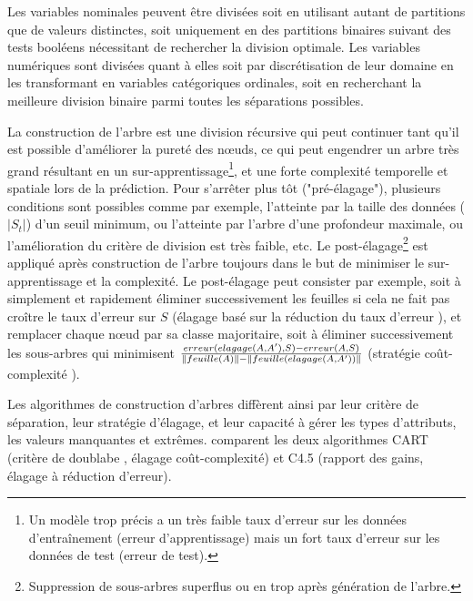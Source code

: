Les variables nominales peuvent être divisées soit en utilisant autant de partitions que de valeurs distinctes, soit uniquement en des partitions binaires suivant des tests booléens nécessitant de rechercher la division optimale. Les variables numériques sont divisées quant à elles soit par discrétisation de leur domaine en les transformant en variables catégoriques ordinales, soit en recherchant la meilleure division binaire parmi  toutes les séparations possibles. 

La construction de l'arbre est une division récursive qui peut continuer tant qu'il est possible d'améliorer la pureté des nœuds, ce qui peut engendrer un arbre très grand résultant en un sur-apprentissage\footnote{Un modèle trop précis a un très faible taux d'erreur sur les données d'entraînement (erreur d'apprentissage) mais un fort taux d'erreur sur les données de test (erreur de test).}, et une forte complexité temporelle et spatiale lors de la prédiction. Pour s'arrêter plus tôt ("pré-élagage"), plusieurs conditions sont possibles comme par exemple, l'atteinte par la taille des données ($\vert S_t \vert$) d'un seuil minimum, ou l'atteinte par l'arbre d'une profondeur maximale, ou l'amélioration du critère de division est très faible, etc. Le post-élagage\footnote{Suppression de sous-arbres superflus ou en trop après génération de l'arbre.} est appliqué après construction de l'arbre toujours dans le but de minimiser le sur-apprentissage et la complexité. Le post-élagage peut consister par exemple, soit à simplement et rapidement éliminer successivement les feuilles si cela  ne fait pas croître le taux d'erreur sur $S$ (\og élagage basé sur la réduction du taux d'erreur \fg{}), et remplacer chaque nœud par sa classe majoritaire, soit à éliminer successivement les sous-arbres qui minimisent $\frac{erreur(elagage(A, A'), S) - erreur(A, S)}{\left\lVert feuille(A)\right\rVert - \left\lVert feuille(elagage(A, A'))\right\rVert}$ (\og stratégie coût-complexité \fg{}). 

Les algorithmes de construction d'arbres diffèrent ainsi par leur critère de séparation, leur stratégie d'élagage, et leur capacité à gérer les types d'attributs, les valeurs manquantes et extrêmes. \citet{singh2014id3cartc45} comparent les deux algorithmes CART \citep{Breiman1984CART} (critère de \og doublabe \fg{}, élagage coût-complexité) et C4.5 \citep{quinlan1993c4.5} (rapport des gains, élagage à réduction d'erreur).

